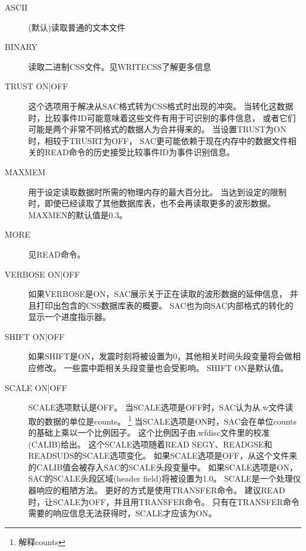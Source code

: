\begin{description}
\item [ASCII] (默认)读取普通的文本文件
\item [BINARY] 读取二进制CSS文件。见WRITECSS了解更多信息
\item [TRUST ON|OFF] 这个选项用于解决从SAC格式转为CSS格式时出现的冲突。
    当转化这数据时，比较事件ID可能意味着这些文件有用于可识别的事件信息，
    或者它们可能是两个非常不同格式的数据人为合并得来的。
    当设置TRUST为ON时，相较于TRUSRT为OFF，
    SAC更可能依赖于现在内存中的数据文件相关的READ命令的历史接受比较事件ID为事件识别信息。%
\item [MAXMEM]用于设定读取数据时所需的物理内存的最大百分比。
    当达到设定的限制时，即使已经读取了其他数据库表，也不会再读取更多的波形数据。
    MAXMEN的默认值是0.3。
\item [MORE] 见READ命令。
\item [VERBOSE ON|OFF] 如果VERBOSE是ON，SAC展示关于正在读取的波形数据的延伸信息，
    并且打印出包含的CSS数据库表的概要。
    SAC也为向SAC内部格式的转化的显示一个进度指示器。
\item [SHIFT ON|OFF] 如果SHIFT是ON，发震时刻将被设置为0，其他相关时间头段变量将会做相应修改。
    一些震中距相关头段变量也会受影响。
    SHIFT ON是默认值。
\item [SCALE ON|OFF] SCALE选项默认是OFF。
    当SCALE选项是OFF时，SAC认为从.w文件读取的数据的单位是counts。
    \footnote{解释counts}
    当SCALE选项是ON时，SAC会在单位counts的基础上乘以一个比例因子。
    这个比例因子由.wfdisc文件里的校准(CALIB)给出。
    这个SCALE选项随着READ SEGY、READGSE和READSUDS的SCALE选项变化。
    如果SCALE选项是OFF，从这个文件来的CALIB值会被存入SAC的SCALE头段变量中。
    如果SCALE选项是ON，SAC的SCALE头段区域(header field)将被设置为1.0。
    SCALE是一个处理仪器响应的粗陋方法。
    更好的方式是使用TRANSFER命令。
    建议READ时，让SCALE为OFF，并且用TRANSFER命令。
    只有在TRANSFER命令需要的响应信息无法获得时，SCALE才应该为ON。

\end{description}
